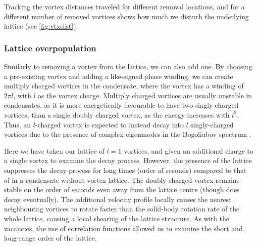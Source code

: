 \iffalse
\begin{figure}[tb]
	\texttt{[image: imgs/Disloc\_-1\_centre\_voronoi\_t100ms\_cbar]}
	\caption{Voronoi cells after removing vortex at condensate centre for t=100 ms. Vortices at edge boundary neglected. }
	\label{fig:voronoi_100ms}
\end{figure}
\fi
Tracking the vortex distances traveled for different removal locations, and for a different number of removed vortices shows how much we
disturb the underlying lattice (see \ref{fig:vtxdist}).

\iffalse
\begin{figure}[tb]
	\texttt{[image: imgs/vtx\_distance\_travelled]}
	\caption{Vortex total traveled distance with different removal positions for between 1 and 3 vortices.}
	\label{fig:vtxdist}
\end{figure}
\fi



\subsubsection{Lattice overpopulation}
Similarly to removing a vortex from the lattice, we can also add one. By choosing a pre-existing vortex and adding a like-signed phase
winding, we can create multiply charged vortices in the condensate, where the vortex has a winding of $2\pi l$, with $l$ as the vortex
charge. Multiply charged vortices are usually unstable in condensates, as it is more energetically favourable to have two singly charged
vortices, than a single doubly charged vortex, as the energy increases with $l^2$. Thus, an $l$-charged vortex is expected to instead decay
into $l$ singly-charged vortices due to the presence of complex eigenmodes in the Bogoliubov spectrum \cite{VTX:Kawaguchi_pra_2004}.

Here we have taken our lattice of $l=1$ vortices, and given an additional charge to a single vortex to examine the decay process. However,
the presence of the lattice suppresses the decay process for long times (order of seconds) compared to that of in a condensate without vortex
lattice. The doubly charged vortex remains stable on the order of seconds even away from the lattice centre (though does decay eventually).
The additional velocity profile locally causes the nearest neighbouring vortices to rotate faster than the solid-body rotation rate of the
whole lattice, causing a local shearing of the lattice structure. As with the vacancies, the use of correlation functions allowed us to
examine the short and long-range order of the lattice.

